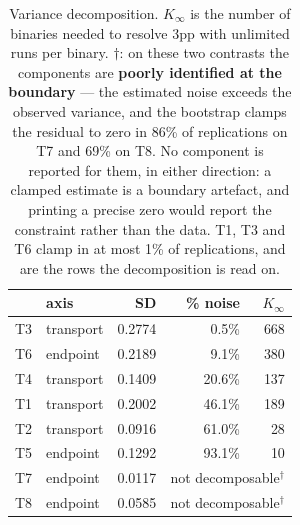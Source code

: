\begin{table}[t]
\caption{Variance decomposition. $K_\infty$ is the number of binaries needed to resolve 3pp with unlimited runs per binary. $\dagger$: on these two contrasts the components are \textbf{poorly identified at the boundary} --- the estimated noise exceeds the observed variance, and the bootstrap clamps the residual to zero in 86\% of replications on T7 and 69\% on T8. No component is reported for them, in either direction: a clamped estimate is a boundary artefact, and printing a precise zero would report the constraint rather than the data. T1, T3 and T6 clamp in at most 1\% of replications, and are the rows the decomposition is read on.}
\label{tab:variance}
\centering
\small
\begin{tabular}{llrrr}
\toprule
& axis & SD & \% noise & $K_\infty$ \\
\midrule
T3 & transport & 0.2774 & 0.5\% & 668 \\
T6 & endpoint & 0.2189 & 9.1\% & 380 \\
T4 & transport & 0.1409 & 20.6\% & 137 \\
T1 & transport & 0.2002 & 46.1\% & 189 \\
T2 & transport & 0.0916 & 61.0\% & 28 \\
T5 & endpoint & 0.1292 & 93.1\% & 10 \\
T7 & endpoint & 0.0117 & \multicolumn{2}{c}{not decomposable$^\dagger$} \\
T8 & endpoint & 0.0585 & \multicolumn{2}{c}{not decomposable$^\dagger$} \\
\bottomrule
\end{tabular}
\end{table}
